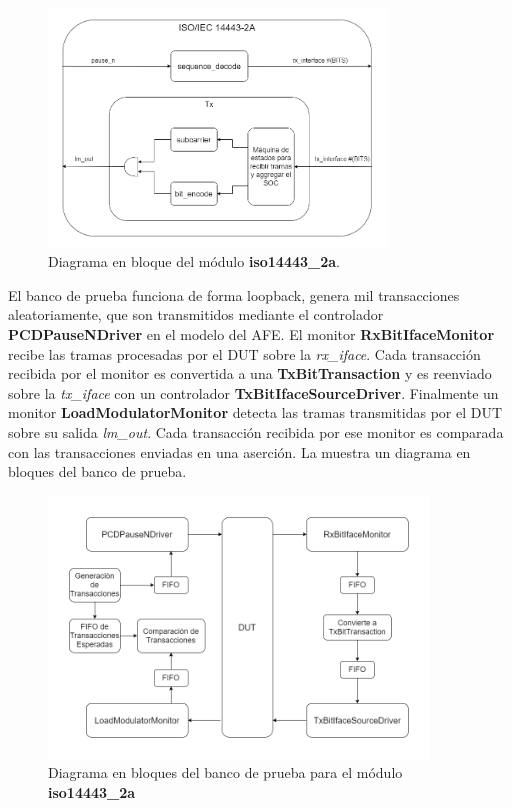 \documentclass[a4paper, twoside, 11pt]{report}
\begin{document}
\begin{figure}[htb]
  \centering
  \includegraphics[width=0.8\textwidth]{./img/iso14443_2a.drawio}
  \caption{Diagrama en bloque del módulo \textbf{iso14443\_2a}.}
  \label{fig:iso14443_2a}
\end{figure}

El banco de prueba funciona de forma loopback, genera mil transacciones aleatoriamente, que son transmitidos mediante el controlador \textbf{PCDPauseNDriver} en el modelo del AFE. El monitor \textbf{RxBitIfaceMonitor} recibe las tramas procesadas por el DUT sobre la \textit{rx\_iface}. Cada transacción recibida por el monitor es convertida a una \textbf{TxBitTransaction} y es reenviado sobre la \textit{tx\_iface} con un controlador \textbf{TxBitIfaceSourceDriver}. Finalmente un monitor \textbf{LoadModulatorMonitor} detecta las tramas transmitidas por el DUT sobre su salida \textit{lm\_out}. Cada transacción recibida por ese monitor es comparada con las transacciones enviadas en una aserción. La  muestra un diagrama en bloques del banco de prueba.

\begin{figure}[htb]
  \centering
  \includegraphics[width=0.9\textwidth]{./img/iso14443_2a_tb.drawio}
  \caption{Diagrama en bloques del banco de prueba para el módulo \textbf{iso14443\_2a}}
  \label{fig:iso14443_2a_tb}
\end{figure}
\end{document}
